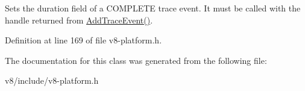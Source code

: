 Sets the duration field of a C\+O\+M\+P\+L\+E\+TE trace event. It must be called with the handle returned from \mbox{\hyperlink{classv8_1_1TracingController_ad1e234b340ea8f9f1e3386aa21dad5dd}{Add\+Trace\+Event()}}. 

Definition at line 169 of file v8-\/platform.\+h.



The documentation for this class was generated from the following file\+:\begin{DoxyCompactItemize}
\item 
v8/include/v8-\/platform.\+h\end{DoxyCompactItemize}
